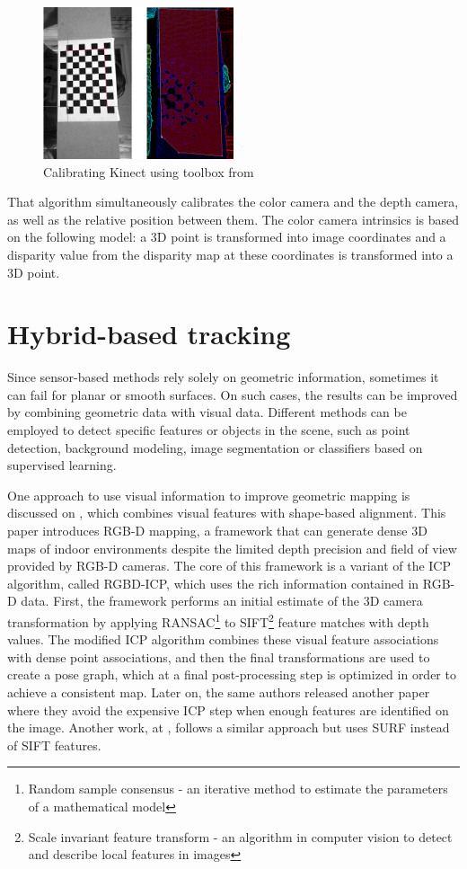 \documentclass[msc, a4paper, classic, en]{ufbathesis}
\begin{document}
\begin{figure}
\label{fig:herrera}
\centering
\includegraphics[width=0.5\textwidth]{images/herrera.png}
\caption{Calibrating Kinect using toolbox from \cite{herrera}}
\end{figure}

That algorithm simultaneously calibrates the color camera and the depth camera, as well as the relative position between them. The color camera intrinsics is based on the following model: a 3D point is transformed into image coordinates and a disparity value from the disparity map at these coordinates is transformed into a 3D point.

\section{Hybrid-based tracking}

Since sensor-based methods rely solely on geometric information, sometimes it can fail for planar or smooth surfaces. On such cases, the results can be improved by combining geometric data with visual data. Different methods can be employed to detect specific features or objects in the scene, such as point detection, background modeling, image segmentation or classifiers based on supervised learning.

One approach to use visual information to improve geometric mapping is discussed on \cite{Hen10RGB}, which combines visual features with shape-based alignment. This paper introduces RGB-D mapping, a framework that can generate dense 3D maps of indoor environments despite the limited depth precision and field of view provided by RGB-D cameras. The core of this framework is a variant of the ICP algorithm, called RGBD-ICP, which uses the rich information contained in RGB-D data. First, the framework performs an initial estimate of the 3D camera transformation by applying RANSAC\footnote{Random sample consensus - an iterative method to estimate the parameters of a mathematical model} to SIFT\footnote{Scale invariant feature transform - an algorithm in computer vision to detect and describe local features in images} feature matches with depth values. The modified ICP algorithm combines these visual feature associations with dense point associations, and then the final transformations are used to create a pose graph, which at a final post-processing step is optimized in order to achieve a consistent map. Later on, the same authors released another paper \cite{Hen12RGB} where they avoid the expensive ICP step when enough features are identified on the image. Another work, at \cite{Engelhard11real-time3-d}, follows a similar approach but uses SURF \cite{bay} instead of SIFT features.
\end{document}
